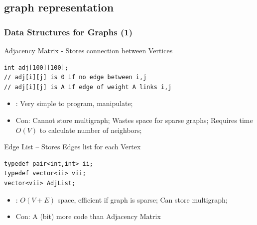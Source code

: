 \documentclass{beamer}
\begin{document}
\subsection{graph representation}
\begin{frame}
  \frametitle{Data Structures for Graphs (1)}
{\smaller
  \begin{block}{Adjacency Matrix - Stores connection between Vertices}
\begin{verbatim}
int adj[100][100];
// adj[i][j] is 0 if no edge between i,j
// adj[i][j] is A if edge of weight A links i,j
\end{verbatim}

    \begin{itemize}
    \item {}: Very simple to program, manipulate;
    \item \alert{Con}: Cannot store multigraph; Wastes space for sparse
      graphs; Requires time $O(V)$ to calculate number of neighbors;
    \end{itemize}
  \end{block}

  \begin{block}{Edge List -- Stores Edges list for each Vertex}
\begin{verbatim}
typedef pair<int,int> ii;
typedef vector<ii> vii;
vector<vii> AdjList;
\end{verbatim}

    \begin{itemize}
    \item {}: $O(V+E)$ space, efficient if graph is sparse; Can store multigraph; 
    \item \alert{Con}: A (bit) more code than Adjacency Matrix
    \end{itemize}
  \end{block}

  }
\end{frame}
\end{document}
